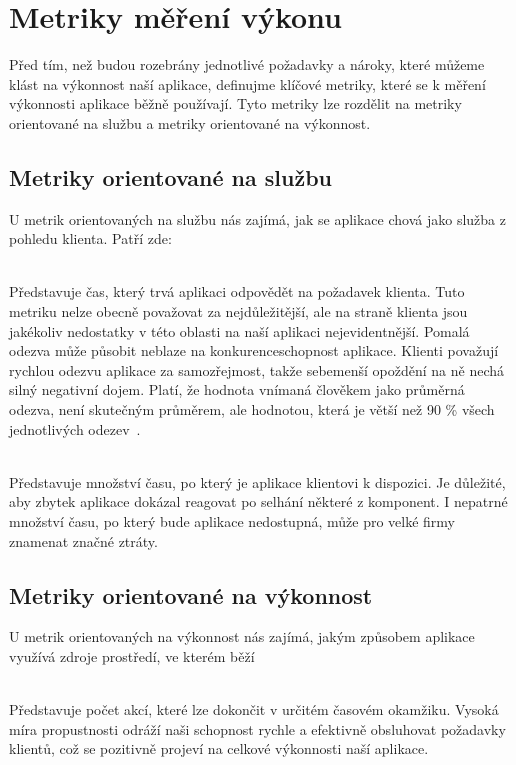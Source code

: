 \documentclass[122pt,oneside]{fithesis}
\begin{document}
\section{Metriky měření výkonu}
Před tím, než budou rozebrány jednotlivé požadavky a nároky, které můžeme klást na výkonnost naší aplikace, definujme klíčové metriky, které se k měření výkonnosti aplikace běžně používají. Tyto metriky lze rozdělit na metriky orientované na službu a metriky orientované na výkonnost.
\subsection{Metriky orientované na službu}
U metrik orientovaných na službu nás zajímá, jak se aplikace chová jako služba z pohledu klienta. Patří zde: 

\vspace{5 mm}
\\\indent Představuje čas, který trvá aplikaci odpovědět na požadavek klienta. Tuto metriku nelze obecně považovat za nejdůležitější, ale na straně klienta jsou jakékoliv nedostatky v této oblasti na naší aplikaci nejevidentnější. Pomalá odezva může působit neblaze na konkurenceschopnost aplikace. Klienti považují rychlou odezvu aplikace za samozřejmost, takže sebemenší opoždění na ně nechá silný negativní dojem. Platí, že hodnota vnímaná člověkem jako průměrná odezva, není skutečným průměrem, ale hodnotou, která je větší než 90 \% všech jednotlivých odezev~\cite{haines06}.

\vspace{5 mm}
\\\indent Představuje množství času, po který je aplikace klientovi k dispozici. Je důležité, aby zbytek aplikace dokázal reagovat po selhání některé z komponent. I nepatrné množství času, po který bude aplikace nedostupná, může pro velké firmy znamenat značné ztráty.

\subsection{Metriky orientované na výkonnost}
U metrik orientovaných na výkonnost nás zajímá, jakým způsobem aplikace využívá zdroje prostředí, ve kterém běží

\vspace{5 mm}
\\\indent Představuje počet akcí, které lze dokončit v určitém časovém okamžiku. Vysoká míra propustnosti odráží naši schopnost rychle a efektivně obsluhovat požadavky klientů, což se pozitivně projeví na celkové výkonnosti naší aplikace.
\end{document}
